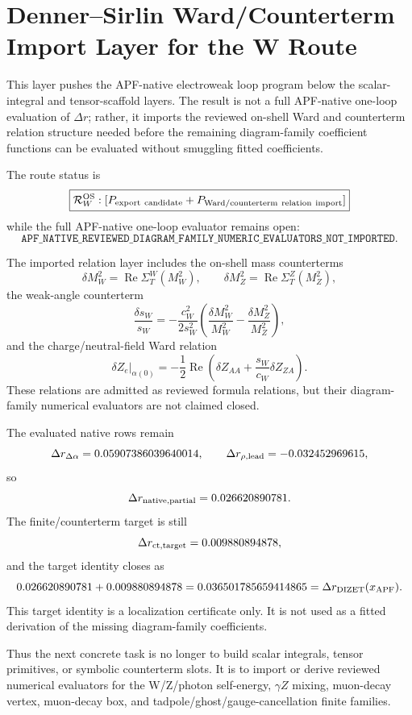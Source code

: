 \section{Denner--Sirlin Ward/Counterterm Import Layer for the W Route}\label{sec:w-trace-v20-ward-import}

This layer pushes the APF-native electroweak loop program below the scalar-integral and tensor-scaffold layers.  The result is not a full APF-native one-loop evaluation of $\Delta r$; rather, it imports the reviewed on-shell Ward and counterterm relation structure needed before the remaining diagram-family coefficient functions can be evaluated without smuggling fitted coefficients.

The route status is
\[
\boxed{\mathcal R_W^{\rm OS}:[P_{\rm export\ candidate}+P_{\rm Ward/counterterm\ relation\ import}]}
\]
while the full APF-native one-loop evaluator remains open:
\[
\boxed{\texttt{APF\_NATIVE\_REVIEWED\_DIAGRAM\_FAMILY\_NUMERIC\_EVALUATORS\_NOT\_IMPORTED}.}
\]

The imported relation layer includes the on-shell mass counterterms
\[
\delta M_W^2=\operatorname{Re}\Sigma_T^W(M_W^2),\qquad
\delta M_Z^2=\operatorname{Re}\Sigma_T^Z(M_Z^2),
\]
the weak-angle counterterm
\[
\frac{\delta s_W}{s_W}=-\frac{c_W^2}{2s_W^2}
\left(\frac{\delta M_W^2}{M_W^2}-\frac{\delta M_Z^2}{M_Z^2}\right),
\]
and the charge/neutral-field Ward relation
\[
\delta Z_e\vert_{\alpha(0)}=-\frac12\operatorname{Re}
\left(\delta Z_{AA}+\frac{s_W}{c_W}\delta Z_{ZA}\right).
\]
These relations are admitted as reviewed formula relations, but their diagram-family numerical evaluators are not claimed closed.

The evaluated native rows remain
\[
\Delta r_{\Delta\alpha}=0.05907386039640014,
\qquad
\Delta r_{\rho,{\rm lead}}=-0.032452969615,
\]
so
\[
\Delta r_{\rm native,partial}=0.026620890781.
\]
The finite/counterterm target is still
\[
\Delta r_{\rm ct,target}=0.009880894878,
\]
and the target identity closes as
\[
0.026620890781+0.009880894878
=0.036501785659414865
=\Delta r_{\rm DIZET}(x_{\rm APF}).
\]
This target identity is a localization certificate only.  It is not used as a fitted derivation of the missing diagram-family coefficients.

Thus the next concrete task is no longer to build scalar integrals, tensor primitives, or symbolic counterterm slots.  It is to import or derive reviewed numerical evaluators for the W/Z/photon self-energy, $\gamma Z$ mixing, muon-decay vertex, muon-decay box, and tadpole/ghost/gauge-cancellation finite families.
